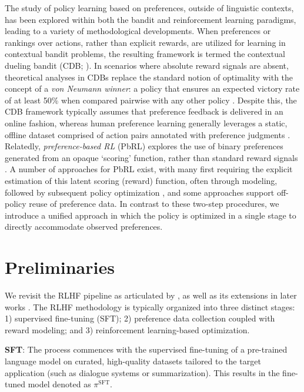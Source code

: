 The study of policy learning based on preferences, outside of linguistic contexts, has been explored within both the bandit and reinforcement learning paradigms, leading to a variety of methodological developments. When preferences or rankings over actions, rather than explicit rewards, are utilized for learning in contextual bandit problems, the resulting framework is termed the contextual dueling bandit (CDB; \cite{yue2012karmed,dudik2015contextual}). In scenarios where absolute reward signals are absent, theoretical analyses in CDBs replace the standard notion of optimality with the concept of a \textit{von Neumann winner}: a policy that ensures an expected victory rate of at least 50\% when compared pairwise with any other policy \citep{dudik2015contextual}. Despite this, the CDB framework typically assumes that preference feedback is delivered in an online fashion, whereas human preference learning generally leverages a static, offline dataset comprised of action pairs annotated with preference judgments \citep{yan2022human}. Relatedly, \textit{preference-based RL} (PbRL) explores the use of binary preferences generated from an opaque ‘scoring’ function, rather than standard reward signals \citep{BusaFekete2014,ruiz2023dueling}. A number of approaches for PbRL exist, with many first requiring the explicit estimation of this latent scoring (reward) function, often through modeling, followed by subsequent policy optimization \citep{jain2013learning,BusaFekete2014,christiano2017deep,sadigh2017active,kupcsik2018learning}, and some approaches support off-policy reuse of preference data. In contrast to these two-step procedures, we introduce a unified approach in which the policy is optimized in a single stage to directly accommodate observed preferences.

\section{Preliminaries}\label{section:prelims}

We revisit the RLHF pipeline as articulated by \citeauthor{ziegler2020finetuning}, as well as its extensions in later works \citep{stiennon2022learning, bai2022training, ouyang2022training}. The RLHF methodology is typically organized into three distinct stages: 1) supervised fine-tuning (SFT); 2) preference data collection coupled with reward modeling; and 3) reinforcement learning-based optimization.

\textbf{SFT}: The process commences with the supervised fine-tuning of a pre-trained language model on curated, high-quality datasets tailored to the target application (such as dialogue systems or summarization). This results in the fine-tuned model denoted as $\pi^\text{SFT}$.

